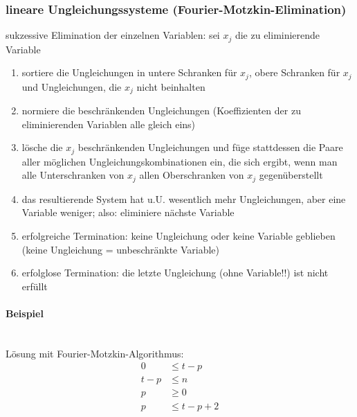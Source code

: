 \subsubsection{lineare Ungleichungssysteme (Fourier-Motzkin-Elimination)}
sukzessive Elimination der einzelnen Variablen: sei $x_j$ die zu eliminierende Variable
\begin{enumerate}
	\item sortiere die Ungleichungen in untere Schranken für $x_j$, obere Schranken für $x_j$ und Ungleichungen, die $x_j$ nicht beinhalten
	\item normiere die beschränkenden Ungleichungen (Koeffizienten der zu eliminierenden Variablen alle gleich eins)
	\item lösche die $x_j$ beschränkenden Ungleichungen und füge stattdessen die Paare aller möglichen Ungleichungskombinationen ein,
		die sich ergibt, wenn man alle Unterschranken von $x_j$ allen Oberschranken von $x_j$ gegenüberstellt
	\item das resultierende System hat u.U. wesentlich mehr Ungleichungen, aber eine Variable weniger; also: eliminiere nächste Variable
	\item erfolgreiche Termination: keine Ungleichung oder keine Variable geblieben (keine Ungleichung = unbeschränkte Variable)
	\item erfolglose Termination: die letzte Ungleichung (ohne Variable!!) ist nicht erfüllt
\end{enumerate}


\paragraph{Beispiel}\\
Lösung mit Fourier-Motzkin-Algorithmus:
\begin{align*}
0   & \leq t-p   \\
t-p & \leq n     \\
p   & \geq 0     \\
p   & \leq t-p+2
\end{align*}

